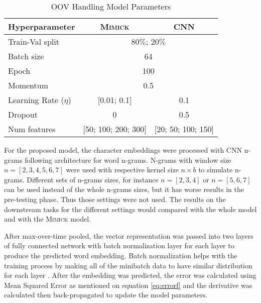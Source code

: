         \begin{table}[]
            \centering
            \caption{OOV Handling Model Parameters}
            \label{tab:hyperparameter}
            \begin{tabular}{@{}lcc@{}}
                \toprule
                \textbf{Hyperparameter} & \multicolumn{1}{c}{\textbf{\textsc{Mimick}}} & \multicolumn{1}{c}{\textbf{CNN}} \\ \midrule
                Train-Val split & \multicolumn{2}{c}{$80\%$; $20\%$}\\
                Batch size & \multicolumn{2}{c}{64} \\
                Epoch & \multicolumn{2}{c}{100} \\
                Momentum & \multicolumn{2}{c}{0.5} \\
                Learning Rate ($\eta$) & [0.01; 0.1] & 0.1 \\
                Dropout & 0 & 0.5 \\
                Num features & [50; 100; 200; 300] & [20; 50; 100; 150] \\ \bottomrule
            \end{tabular}
        \end{table}

        For the proposed model, the character embeddings were
        processed with CNN n-grams following
        \cite{convolutional2014kim} architecture for word n-grams.
        N-grams with window size $n = [2, 3, 4, 5, 6, 7]$ were used
        with respective kernel size $n \times b$ to simulate n-grams.
        Different sets of n-grams sizes, for instance $n = [2, 3, 4]$
        or $n = [5, 6, 7]$ can be used instead of the whole n-grams
        sizes, but it has worse results in the pre-testing phase. Thus
        those settings were not used. The results on the downstream
        tasks for the different settings would compared with the whole
        model and with the \textsc{Mimick} model.

        After max-over-time pooled, the vector representation was
        passed into two layers of fully connected network with batch
        normalization layer for each layer to produce the predicted
        word embedding. Batch normalization helps with the training
        process by making all of the minibatch data to have similar
        distribution for each layer
        \citep{batchnorm:DBLP:journals/corr/IoffeS15}. After the
        embedding was predicted, the error was calculated using Mean
        Squared Error as mentioned on equation \ref{eq:errorf} and the
        derivative was calculated then back-propagated to update the
        model parameters.

